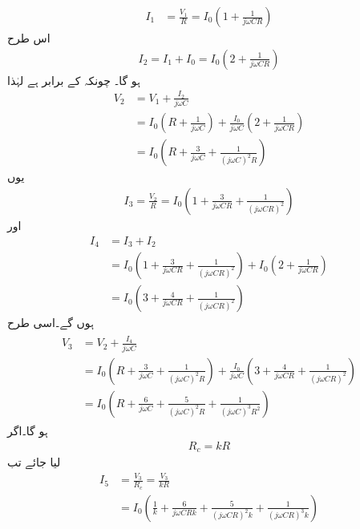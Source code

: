 \begin{align*}
I_1 &=\frac{V_1}{R}=I_0 \left (1+\frac{1}{j \omega C R} \right)
\end{align*}
اس طرح
\begin{align*}
I_2 =I_1+I_0=I_0 \left (2+\frac{1}{j \omega C R} \right)
\end{align*}
ہو گا۔ چونکہ  کے برابر ہے لہٰذا
\begin{align*}
V_2 &=V_1+\frac{I_2}{j \omega C} \\
&=I_0 \left (R+\frac{1}{j \omega C} \right )+\frac{I_0}{j \omega C} \left (2+\frac{1}{j \omega C R} \right )\\
&=I_0 \left (R+\frac{3}{j \omega C} +\frac{1}{\left(j \omega C \right )^2 R}\right )
\end{align*}
یوں
\begin{align*}
I_3=\frac{V_2}{R}=I_0 \left (1+\frac{3}{j \omega C R}+\frac{1}{\left(j \omega C R \right )^2} \right )
\end{align*}
اور
\begin{align*}
I_4 &=I_3 +I_2\\
&=I_0 \left (1+\frac{3}{j \omega C R}+\frac{1}{\left(j \omega C R \right )^2} \right )+I_0 \left (2+\frac{1}{j \omega C R} \right) \\
&=I_0 \left(3+\frac{4}{j \omega C R}+\frac{1}{\left (j \omega C R \right )^2} \right)
\end{align*}
ہوں گے۔اسی طرح
\begin{gather}
\begin{aligned} \label{مساوات_مزاحمت_کپیسٹر_دباو_تین}
V_3 &=V_2 +\frac{I_4}{j \omega C} \\
&=I_0 \left (R+\frac{3}{j \omega C} +\frac{1}{\left(j \omega C \right )^2 R}\right )+ \frac{I_0}{j \omega C} \left(3+\frac{4}{j \omega C R}+\frac{1}{\left (j \omega C R \right )^2} \right) \\
&=I_0 \left(R+\frac{6}{j \omega C}+\frac{5}{\left(j \omega C \right )^2 R} +\frac{1}{\left(j \omega C \right )^3 R^2}\right)
\end{aligned}
\end{gather}
ہو گا۔اگر
\begin{align}
R_c = k R
\end{align}
لیا جائے تب
\begin{align*}
I_5 &= \frac{V_3}{R_c} =\frac{V_3}{k R}\\ 
&= I_0 \left(\frac{1}{k}+\frac{6}{j \omega C R k}+\frac{5}{\left(j \omega C  R\right )^2 k} +\frac{1}{\left(j \omega C  R\right )^3 k}\right)
\end{align*}
